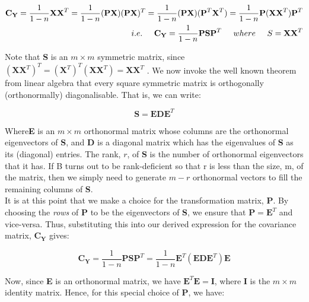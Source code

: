 \documentclass[12pt]{article}
\theoremstyle{plain}
\begin{document}
\begin{equation}
\begin{split}
\textbf{C}_{\textbf{Y}}= \frac{1}{1-n}\textbf{XX}^T=\frac{1}{1-n}(\textbf{PX})(\textbf{PX})^T =\frac{1}{1-n}(\textbf{PX})(\textbf{P}^T\textbf{X}^T)
=\frac{1}{1-n}\textbf{P}(\textbf{XX}^T)\textbf{P}^T \\
 i.e. \hspace{0.5cm}\textbf{C}_{\textbf{Y}} =  \frac{1}{1-n}\textbf{PSP}^T \hspace{0.5cm} where \hspace{0.5cm} S=\textbf{XX}^T
\end{split}
\end{equation}

Note that \textbf{S} is an $m\times m$ symmetric matrix, since $(\textbf{XX}^T)^T = (\textbf{X}^T)^T(\textbf{XX}^T)=\textbf{XX}^T$ . We now invoke the well known theorem from linear algebra that every square symmetric matrix is orthogonally (orthonormally) diagonalisable. That is, we can write:

\begin{equation}
\textbf{S}= \textbf{EDE}^T
\end{equation}

Where\textbf{E} is an $m\times m$ orthonormal matrix whose columns are the orthonormal eigenvectors of \textbf{S}, and \textbf{D} is a diagonal matrix which has the eigenvalues of \textbf{S} as its (diagonal) entries. The rank, $ r$, of \textbf{S} is the number of orthonormal eigenvectors that it has. If B turns out to be rank-deficient so that r is less than the size, m, of the matrix, then we simply need to generate $m-r$ orthonormal vectors to fill the remaining columns of \textbf{S}.
\\

It is at this point that we make a choice for the transformation matrix, \textbf{P}. By choosing
the \emph{rows} of \textbf{P} to be the eigenvectors of \textbf{S}, we ensure that $\textbf{P}= \textbf{E}^T$ and vice-versa. Thus, substituting this into our derived expression for the covariance matrix, $\textbf{C}_{\textbf{Y}}$ gives:

\begin{equation}
\textbf{C}_{\textbf{Y}} =  \frac{1}{1-n}\textbf{PSP}^T =\frac{1}{1-n}\textbf{E}^T(\textbf{EDE}^T)\textbf{E}
\end{equation}

Now, since \textbf{E} is an orthonormal matrix, we have $\textbf{E}^T\textbf{E} = \textbf{I}$, where  \textbf{I} is the $m \times m$ identity matrix. Hence, for this special choice of  \textbf{P}, we have:
\end{document}

